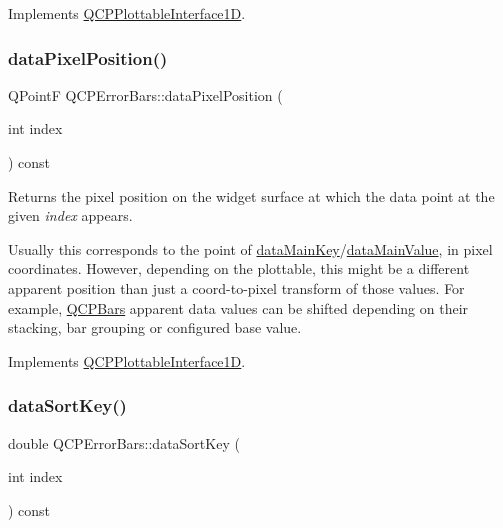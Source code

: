 Implements \hyperlink{classQCPPlottableInterface1D_af6330919e8023277d08c958a6074fc76}{Q\+C\+P\+Plottable\+Interface1D}.

\mbox{\label{classQCPErrorBars_ae79fed6566f1912a97344b20b35faac1}} 
\subsubsection{\texorpdfstring{data\+Pixel\+Position()}{dataPixelPosition()}}
{\footnotesize\ttfamily Q\+PointF Q\+C\+P\+Error\+Bars\+::data\+Pixel\+Position (\begin{DoxyParamCaption}\item[{int}]{index }\end{DoxyParamCaption}) const\hspace{0.3cm}{\ttfamily [virtual]}}

Returns the pixel position on the widget surface at which the data point at the given {\itshape index} appears.

Usually this corresponds to the point of \hyperlink{classQCPErrorBars_a7cba420078adc523efa59fb8c6ca23e0}{data\+Main\+Key}/\hyperlink{classQCPErrorBars_ae9f6c79c03147efb1a67742c55386dc8}{data\+Main\+Value}, in pixel coordinates. However, depending on the plottable, this might be a different apparent position than just a coord-\/to-\/pixel transform of those values. For example, \hyperlink{classQCPBars}{Q\+C\+P\+Bars} apparent data values can be shifted depending on their stacking, bar grouping or configured base value. 

Implements \hyperlink{classQCPPlottableInterface1D_a78911838cfbcfd2d8df9ad2fdbfb8e93}{Q\+C\+P\+Plottable\+Interface1D}.

\mbox{\label{classQCPErrorBars_a3000a036124880a90c629d124c1cd1e2}} 
\subsubsection{\texorpdfstring{data\+Sort\+Key()}{dataSortKey()}}
{\footnotesize\ttfamily double Q\+C\+P\+Error\+Bars\+::data\+Sort\+Key (\begin{DoxyParamCaption}\item[{int}]{index }\end{DoxyParamCaption}) const\hspace{0.3cm}{\ttfamily [virtual]}}

